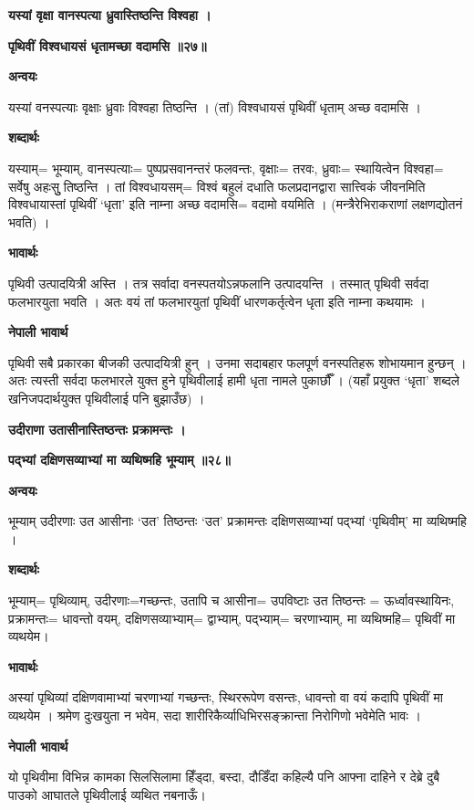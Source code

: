 \documentclass[11pt, a5paper]{article}
\begin{document}
\textbf{यस्यां वृक्षा वानस्पत्या ध्रुवास्तिष्ठन्ति विश्वहा ।}

\textbf{पृथिवीं विश्वधायसं धृतामच्छा वदामसि ॥२७॥}

\textbf{अन्वयः}

यस्यां वनस्पत्याः वृक्षाः ध्रुवाः विश्वहा तिष्ठन्ति । (तां) विश्वधायसं पृथिवीं धृताम् अच्छ वदामसि ।

\textbf{शब्दार्थः}

यस्याम्= भूम्याम्, वानस्पत्याः= पुष्पप्रसवानन्तरं फलवन्तः, वृक्षाः= तरवः, ध्रुवाः= स्थायित्वेन विश्वहा= सर्वेषु अहःसुु तिष्ठन्ति । तां विश्वधायसम्= विश्वं बहुलं दधाति फलप्रदानद्वारा सात्त्विकं जीवनमिति विश्वधायास्तां पृथिवीं ‘धृता’ इति नाम्ना अच्छ वदामसि= वदामो वयमिति । (मन्त्रैरेभिराकराणां लक्षणद्योतनं भवति) ।

\textbf{भावार्थः}

पृथिवी उत्पादयित्री अस्ति । तत्र सर्वादा वनस्पतयोऽन्नफलानि उत्पादयन्ति । तस्मात् पृथिवी सर्वदा फलभारयुता भवति । अतः वयं तां फलभारयुतां पृथिवीं धारणकर्तृत्वेन धृता इति नाम्ना कथयामः ।

\textbf{नेपाली भावार्थ}

पृथिवी सबै प्रकारका बीजकी उत्पादयित्री हुन् । उनमा सदाबहार फलपूर्ण वनस्पतिहरू शोभायमान हुन्छन् । अतः त्यस्ती सर्वदा फलभारले युक्त हुने पृथिवीलाई हामी धृता नामले पुकार्छौँ । (यहाँ प्रयुक्त ‘धृता’ शब्दले खनिजपदार्थयुक्त पृथिवीलाई पनि बुझाउँछ) ।

\textbf{उदीराणा उतासीनास्तिष्ठन्तः प्रक्रामन्तः ।}

\textbf{पद्भ्यां दक्षिणसव्याभ्यां मा व्यथिष्महि भूम्याम् ॥२८॥}

\textbf{अन्वयः}

भूम्याम् उदीरणाः उत आसीनाः ‘उत’ तिष्ठन्तः ‘उत’ प्रक्रामन्तः दक्षिणसव्याभ्यां पद्भ्यां ‘पृथिवीम्’ मा व्यथिष्महि ।

\textbf{शब्दार्थः}

भूम्याम्= पृथिव्याम्, उदीरणाः=गच्छन्तः, उतापि च आसीना= उपविष्टाः उत तिष्ठन्तः = ऊर्ध्वावस्थायिनः, प्रक्रामन्तः= धावन्तो वयम्, दक्षिणसव्याभ्याम्= द्वाभ्याम्, पद्भ्याम्= चरणाभ्याम्, मा व्यथिष्महि= पृथिवीं मा व्यथयेम।

\textbf{भावार्थः}

अस्यां पृथिव्यां दक्षिणवामाभ्यां चरणाभ्यां गच्छन्तः, स्थिररूपेण वसन्तः, धावन्तो वा वयं कदापि पृथिवीं मा व्यथयेम । श्रमेण दुःखयुता न भवेम, सदा शारीरिकैर्व्याधिभिरसङ्‌क्रान्ता निरोगिणो भवेमेति भावः ।

\textbf{नेपाली भावार्थ}

यो पृथिवीमा विभिन्न कामका सिलसिलामा हिँड्‌दा, बस्दा, दौडिँदा कहिल्यै पनि आफ्ना दाहिने र देब्रे दुबै पाउको आघातले पृथिवीलाई व्यथित नबनाऊँ।
\end{document}
